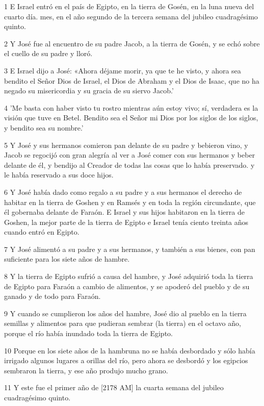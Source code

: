 \par 1 E Israel entró en el país de Egipto, en la tierra de Gosén, en la luna nueva del cuarto día. mes, en el año segundo de la tercera semana del jubileo cuadragésimo quinto.
\par 2 Y José fue al encuentro de su padre Jacob, a la tierra de Gosén, y se echó sobre el cuello de su padre y lloró.
\par 3 E Israel dijo a José: «Ahora déjame morir, ya que te he visto, y ahora sea bendito el Señor Dios de Israel, el Dios de Abraham y el Dios de Isaac, que no ha negado su misericordia y su gracia de su siervo Jacob.'
\par 4 'Me basta con haber visto tu rostro mientras aún estoy vivo; sí, verdadera es la visión que tuve en Betel. Bendito sea el Señor mi Dios por los siglos de los siglos, y bendito sea su nombre.'
\par 5 Y José y sus hermanos comieron pan delante de su padre y bebieron vino, y Jacob se regocijó con gran alegría al ver a José comer con sus hermanos y beber delante de él, y bendijo al Creador de todas las cosas que lo había preservado. y le había reservado a sus doce hijos.
\par 6 Y José había dado como regalo a su padre y a sus hermanos el derecho de habitar en la tierra de Goshen y en Ramsés y en toda la región circundante, que él gobernaba delante de Faraón. E Israel y sus hijos habitaron en la tierra de Goshen, la mejor parte de la tierra de Egipto e Israel tenía ciento treinta años cuando entró en Egipto.
\par 7 Y José alimentó a su padre y a sus hermanos, y también a sus bienes, con pan suficiente para los siete años de hambre.
\par 8 Y la tierra de Egipto sufrió a causa del hambre, y José adquirió toda la tierra de Egipto para Faraón a cambio de alimentos, y se apoderó del pueblo y de su ganado y de todo para Faraón.
\par 9 Y cuando se cumplieron los años del hambre, José dio al pueblo en la tierra semillas y alimentos para que pudieran sembrar (la tierra) en el octavo año, porque el río había inundado toda la tierra de Egipto.
\par 10 Porque en los siete años de la hambruna no se había desbordado y sólo había irrigado algunos lugares a orillas del río, pero ahora se desbordó y los egipcios sembraron la tierra, y ese año produjo mucho grano.
\par 11 Y este fue el primer año de [2178 AM] la cuarta semana del jubileo cuadragésimo quinto.
